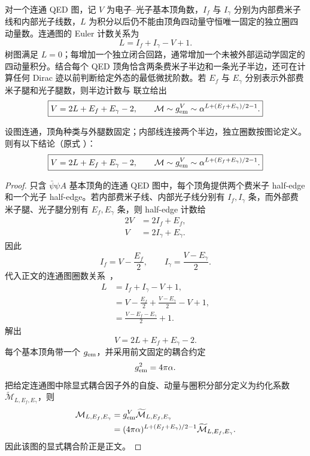 对一个连通 QED 图，记 $V$ 为电子--光子基本顶角数，$I_f$ 与 $I_\gamma$ 分别为内部费米子线和内部光子线数，$L$ 为积分以后仍不能由顶角四动量守恒唯一固定的独立圈四动量数。连通图的 Euler 计数关系为
\begin{equation}
 \boxed{
 L=I_f+I_\gamma-V+1.}
 \label{eq:qed-loop-euler-dp7}
\end{equation}
树图满足 $L=0$；每增加一个独立闭合回路，通常增加一个未被外部运动学固定的四动量积分。结合每个 QED 顶角恰含两条费米子半边和一条光子半边，还可在计算任何 Dirac 迹以前判断给定外态的最低微扰阶数。若 $E_f$ 与 $E_\gamma$ 分别表示外部费米子腿和光子腿数，则半边计数与 联立给出
\begin{equation}
\boxed{
V=2L+E_f+E_\gamma-2,
\qquad
\mathcal M\sim g_{\rm em}^{V}
\sim\alpha^{L+(E_f+E_\gamma)/2-1}.}
\label{eq:qed-vertex-count-order-dp76}
\end{equation}

\begin{proposition}
设图连通，顶角种类与外腿数固定；内部线连接两个半边，独立圈数按图论定义。则有以下结论（原式 ）：
\begin{equation*}
\boxed{
V=2L+E_f+E_\gamma-2,
\qquad
\mathcal M\sim g_{\rm em}^{V}
\sim\alpha^{L+(E_f+E_\gamma)/2-1}.}
\end{equation*}
\end{proposition}
\begin{proof}
只含 $\bar\psi\psi A$ 基本顶角的连通 QED 图中，每个顶角提供两个费米子 half-edge 和一个光子 half-edge。若内部费米子线、内部光子线分别有 $I_f,I_\gamma$ 条，而外部费米子腿、光子腿分别有 $E_f,E_\gamma$ 条，则 half-edge 计数给
\begin{align*}
2V&=2I_f+E_f,\\
V&=2I_\gamma+E_\gamma.
\end{align*}
因此
\begin{equation*}
I_f=V-\frac{E_f}{2},
\qquad
I_\gamma=\frac{V-E_\gamma}{2}.
\end{equation*}
代入正文的连通图圈数关系~，
\begin{align*}
L
&=I_f+I_\gamma-V+1,\\
&=V-\frac{E_f}{2}+\frac{V-E_\gamma}{2}-V+1,\\
&=\frac{V-E_f-E_\gamma}{2}+1.
\end{align*}
解出
\begin{equation*}
V=2L+E_f+E_\gamma-2.
\end{equation*}
每个基本顶角带一个 $g_{\rm em}$，并采用前文固定的耦合约定
\begin{equation*}
 g_{\rm em}^2=4\pi\alpha.
\end{equation*}
把给定连通图中除显式耦合因子外的自旋、动量与圈积分部分定义为约化系数 $\widetilde{\mathcal M}_{L,E_f,E_\gamma}$，则
\begin{align*}
 \mathcal M_{L,E_f,E_\gamma}
 &=g_{\rm em}^{V}\widetilde{\mathcal M}_{L,E_f,E_\gamma}\\
 &=(4\pi\alpha)^{L+(E_f+E_\gamma)/2-1}
 \widetilde{\mathcal M}_{L,E_f,E_\gamma}.
\end{align*}
因此该图的显式耦合阶正是正文。
\end{proof}

